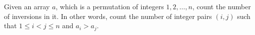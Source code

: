 Given an array $a$, which is a permutation of integers $1,2,\ldots,n$, count the number of inversions in it.
In other words, count the number of integer pairs $(i, j)$
such that $1 \leq i < j \leq n$ and $a_i > a_j$.